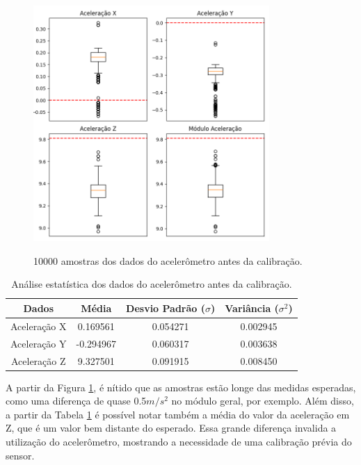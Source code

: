 \documentclass[acronym, symbols, table]{fei}
\begin{document}
	\begin{figure}[!htb]
		\centering
		\caption{10000 amostras dos dados do acelerômetro antes da calibração.}
		\includegraphics[width=0.8\textwidth]{dados_acelerometro_errados.png}
		\label{fig:dados_acelerometro_errado}
	\end{figure}
	
	\begin{table}[!htb]
		\centering
		\caption{Análise estatística dos dados do acelerômetro antes da calibração.}\label{tab:acelerometro_antes_calibracao}
		\begin{tabular}{|c|c|c|c|}
			\hline
			Dados & Média & Desvio Padrão ($\sigma$) & Variância ($\sigma^2$) \\ \hline
			\small Aceleração X & 0.169561  & 0.054271 & 0.002945 \\ \hline
			\small Aceleração Y & -0.294967 & 0.060317 & 0.003638 \\ \hline
			\small Aceleração Z & 9.327501  & 0.091915 & 0.008450 \\ \hline			
		\end{tabular}
	\end{table}
	
	A partir da Figura \ref{fig:dados_acelerometro_errado}, é nítido que as amostras estão longe das medidas esperadas, como uma diferença de quase 0.5$m/s^2$ no módulo geral, por exemplo. Além disso, a partir da Tabela \ref{tab:acelerometro_antes_calibracao} é possível notar também a média do valor da aceleração em Z, que é um valor bem distante do esperado. Essa grande diferença invalida a utilização do acelerômetro, mostrando a necessidade de uma calibração prévia do sensor.
	
\end{document}
